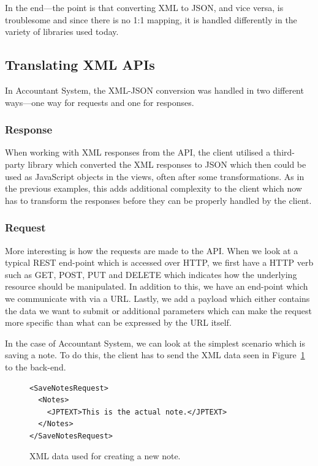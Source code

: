 \documentclass{cslthse-msc}
\begin{document}
In the end---the point is that converting XML to JSON, and vice versa, is troublesome and since there is no 1:1 mapping, it is handled differently in the variety of libraries used today.

\subsection{Translating XML APIs}
In Accountant System, the XML-JSON conversion was handled in two different ways---one way for requests and one for responses.

\subsubsection{Response}

When working with XML responses from the API, the client utilised a third-party library which converted the XML responses to JSON which then could be used as JavaScript objects in the views, often after some transformations. As in the previous examples, this adds additional complexity to the client which now has to transform the responses before they can be properly handled by the client.

\subsubsection{Request}
More interesting is how the requests are made to the API. When we look at a typical REST end-point which is accessed over HTTP, we first have a HTTP verb such as GET, POST, PUT and DELETE which indicates how the underlying resource should be manipulated. In addition to this, we have an end-point which we communicate with via a URL. Lastly, we add a payload which either contains the data we want to submit or additional parameters which can make the request more specific than what can be expressed by the URL itself.

In the case of Accountant System, we can look at the simplest scenario which is saving a note. To do this, the client has to send the XML data seen in Figure~\ref{fig:xml_account_example} to the back-end.

\begin{figure}[H]
  \centering
    \begin{center}
\begin{lstlisting}[breaklines=true,frame=single]
<SaveNotesRequest>
  <Notes>
    <JPTEXT>This is the actual note.</JPTEXT>
  </Notes>
</SaveNotesRequest>
\end{lstlisting}
    \end{center}
  \caption{XML data used for creating a new note.}
  \label{fig:xml_account_example}
\end{figure}
\end{document}
